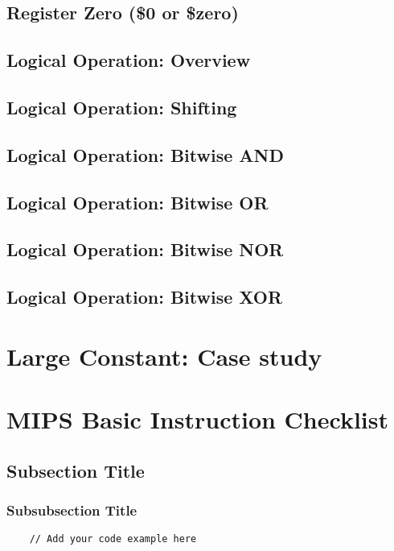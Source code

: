 \documentclass[12pt]{article} %
\begin{document}
\subsection{Register Zero (\$0 or \$zero)}
\subsection{Logical Operation: Overview}
\subsection{Logical Operation: Shifting}
\subsection{Logical Operation: Bitwise AND}
\subsection{Logical Operation: Bitwise OR} 
\subsection{Logical Operation: Bitwise NOR}
\subsection{Logical Operation: Bitwise XOR}
\section{Large Constant: Case study}
\section{MIPS Basic Instruction Checklist}






\subsection{Subsection Title}

\subsubsection{Subsubsection Title}

\begin{lstlisting}
    // Add your code example here
\end{lstlisting}
\end{document}
